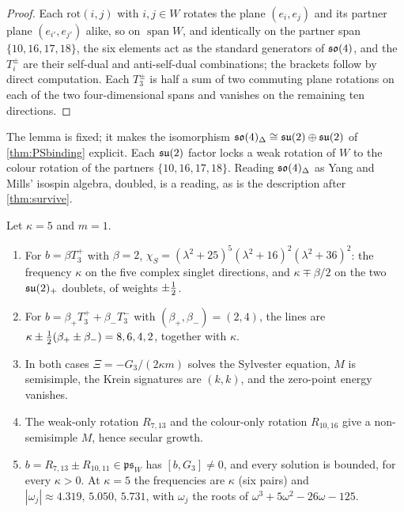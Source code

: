 \begin{proof}
Each $\mathrm{rot}(i,j)$ with $i,j\in W$ rotates the plane $(e_i,e_j)$ and its partner plane $(e_{i'},e_{j'})$ alike, so on $\operatorname{span}W$, and
identically on the partner span $\{10,16,17,18\}$, the six elements act as the standard generators of $\mathfrak{so}(4)$, and the $T^\pm_i$ are their
self-dual and anti-self-dual combinations; the brackets follow by direct computation. Each $T^\pm_3$ is half a sum of two commuting plane rotations
on each of the two four-dimensional spans and vanishes on the remaining ten directions.
\end{proof}

The lemma is fixed; it makes the isomorphism $\mathfrak{so}(4)_\Delta\cong\mathfrak{su}(2)\oplus\mathfrak{su}(2)$ of \cref{thm:PSbinding} explicit. Each $\mathfrak{su}(2)$ factor locks a weak rotation of $W$ to the colour rotation of the partners $\{10,16,17,18\}$. Reading $\mathfrak{so}(4)_\Delta$ as Yang and Mills'
isospin algebra, doubled, is a reading, as is the description after \cref{thm:survive}.

\begin{proposition}
\label{bf:so4spec}
Let $\kappa=5$ and $m=1$.
\begin{enumerate}[label=(\roman*),leftmargin=2.2em]
\item For $b=\beta T^+_3$ with $\beta=2$, $\chi_S=(\lambda^2+25)^5(\lambda^2+16)^2(\lambda^2+36)^2$: the frequency $\kappa$ on the five complex singlet
directions, and $\kappa\mp\beta/2$ on the two $\mathfrak{su}(2)_+$ doublets, of weights $\pm\tfrac12$.
\item For $b=\beta_+T^+_3+\beta_-T^-_3$ with $(\beta_+,\beta_-)=(2,4)$, the lines are $\kappa\pm\tfrac12(\beta_+\pm\beta_-)=8,6,4,2$, together with $\kappa$.
\item In both cases $\Xi=-G_3/(2\kappa m)$ solves the Sylvester equation, $M$ is semisimple, the Krein signatures are $(k,k)$, and the zero-point
energy vanishes.
\item The weak-only rotation $R_{7,13}$ and the colour-only rotation $R_{10,16}$ give a non-semisimple $M$, hence secular growth.
\item $b=R_{7,13}\pm R_{10,11}\in\mathfrak{ps}_W$ has $[b,G_3]\neq0$, and every solution is bounded, for every $\kappa>0$. At $\kappa=5$ the frequencies
are $\kappa$ (six pairs) and $|\omega_j|\approx4.319,\,5.050,\,5.731$, with $\omega_j$ the roots of $\omega^3+5\omega^2-26\omega-125$.
\end{enumerate}
\end{proposition}

